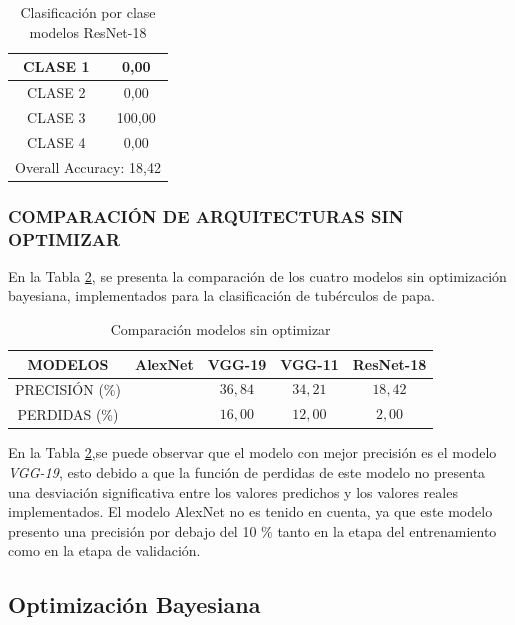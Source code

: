 \begin{table}[htbp]
	\centering
	\begin{tabular}{|c|c|}
		\hline
		CLASE 1 & 0,00 \bigstrut\\
		\hline
		CLASE 2 & 0,00 \bigstrut\\
		\hline
		CLASE 3 & 100,00 \bigstrut\\
		\hline
		CLASE 4 & 0,00 \bigstrut\\
		\hline
		\multicolumn{2}{|c|}{Overall Accuracy: 18,42} \bigstrut\\
		\hline
	\end{tabular}%
	\caption{Clasificación por clase modelos ResNet-18}
	\label{clase_RESNET18}
\end{table}%


\newpage	
\subsubsection{\MakeUppercase{Comparación de arquitecturas sin optimizar}}
En la Tabla \ref{table:compasin}, se presenta la comparación de los cuatro modelos sin optimización bayesiana, implementados para la clasificación de tubérculos de papa.

\begin{table}[ht]
	\centering
	\begin{tabular}{|c|c|c|c|c|}
		\hline
		MODELOS & AlexNet & VGG-19 & VGG-11 & ResNet-18 \\
		\hline
		PRECISIÓN (\%) &  & $$36,84$$ & $$34,21$$ & $$18,42$$ \\
		\hline
		PERDIDAS (\%) &  & $$16,00$$ & $$12,00$$ & $$2,00$$ \\
		\hline
	\end{tabular}	
	\caption{Comparación modelos sin optimizar}
	\label{table:compasin}
\end{table}	

En la Tabla \ref{table:compasin},se puede observar que el modelo con mejor precisión es el modelo \textit{VGG-19}, esto debido a que la función de perdidas de este modelo no presenta una desviación significativa entre los valores predichos y los valores reales implementados. El modelo AlexNet no es tenido en cuenta, ya que este modelo presento una precisión por debajo del 10 \% tanto en la etapa del entrenamiento como en la etapa de validación.


\newpage
\subsection{Optimización Bayesiana}

